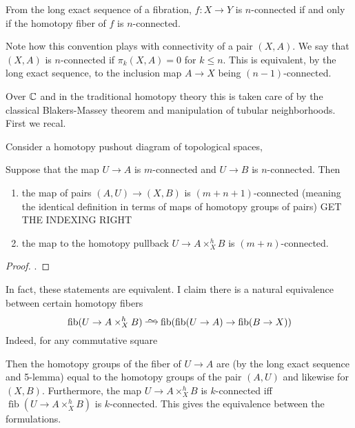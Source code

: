 \documentclass[12pt]{article}
\DeclareMathOperator{\fib}{\mathrm{fib}}
\begin{document}
\begin{rmk}
From the long exact sequence of a fibration, $f : X \to Y$ is $n$-connected if and only if the homotopy fiber of $f$ is $n$-connected.
\end{rmk}

\begin{rmk}
Note how this convention plays with connectivity of a pair $(X, A)$. We say that $(X,A)$ is $n$-connected if $\pi_k(X,A) = 0$ for $k \le n$. This is equivalent, by the long exact sequence, to the inclusion map $A \to X$ being $(n-1)$-connected.
\end{rmk}

 Over $\mathbb{C}$ and in the traditional homotopy theory this is taken care of by the classical Blakers-Massey theorem and manipulation of tubular neighborhoods. First we recal.

\begin{prop}
Consider a homotopy pushout diagram of topological spaces,
\begin{center}
\end{center}
Suppose that the map $U \to A$ is $m$-connected and $U \to B$ is $n$-connected. Then
\begin{enumerate}
\item the map of pairs $(A, U) \to (X, B)$ is $(m + n + 1)$-connected (meaning the identical definition in terms of maps of homotopy groups of pairs) {\color{red} GET THE INDEXING RIGHT}
\item the map to the homotopy pullback $U \to A \times^h_X B$ is $(m+n)$-connected.
\end{enumerate} 
\end{prop}

\begin{proof}
. 
\end{proof}

\begin{rmk}
In fact, these statements are equivalent. I claim there is a natural equivalence between certain homotopy fibers
\[ \fib(U \to A \times^h_X B) \iso \fib(\fib(U \to A) \to \fib(B \to X)) \]
Indeed, for any commutative square
\begin{center}
\end{center}
Then the homotopy groups of the fiber of $U \to A$ are (by the long exact sequence and 5-lemma) equal to the homotopy groups of the pair $(A, U)$ and likewise for $(X, B)$. Furthermore, the map $U \to A \times^h_X B$ is $k$-connected iff $\fib(U \to A \times^h_X B)$ is $k$-connected. This gives the equivalence between the formulations. 
\end{rmk}
\end{document}
